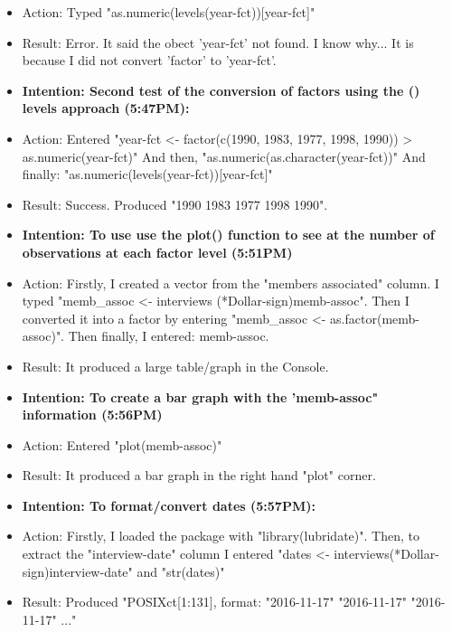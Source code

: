\documentclass[a4paper,12pt]{article}
\begin{document}
\begin{itemize}
\item Action: Typed "as.numeric(levels(year-fct))[year-fct]"


\item Result: Error. It said the obect 'year-fct' not found. I know why... It is because I did not convert 'factor' to 'year-fct'.


\item \textbf{Intention: Second test of the conversion of factors using the () levels approach (5:47PM):}


\item Action: Entered "year-fct <- factor(c(1990, 1983, 1977, 1998, 1990))
> as.numeric(year-fct)" And then, "as.numeric(as.character(year-fct))" And finally: "as.numeric(levels(year-fct))[year-fct]"


\item Result: Success. Produced "1990 1983 1977 1998 1990".


\item \textbf{Intention: To use use the plot() function to see at the number of observations at each factor level (5:51PM)}


\item Action: Firstly, I created a vector from the "members associated" column. I typed "memb_assoc <- interviews (*Dollar-sign)memb-assoc". Then I converted it into a factor by entering "memb_assoc <- as.factor(memb-assoc)". Then finally, I entered: memb-assoc. 


\item Result: It produced a large table/graph in the Console. 


\item \textbf{Intention: To create a bar graph with the 'memb-assoc" information (5:56PM)}


\item Action: Entered "plot(memb-assoc)"


\item Result: It produced a bar graph in the right hand "plot" corner. 


\item \textbf{Intention: To format/convert dates (5:57PM):}


\item Action: Firstly, I loaded the package with "library(lubridate)". Then, to extract the "interview-date" column I entered "dates <- interviews(*Dollar-sign)interview-date" and 
"str(dates)"

\item Result: Produced "POSIXct[1:131], format: "2016-11-17" "2016-11-17" "2016-11-17" ..." 



\end{itemize}
\end{document}

